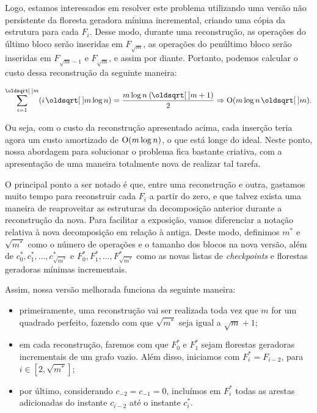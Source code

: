Logo, estamos interessados em resolver este problema utilizando uma versão não persistente da floresta geradora mínima incremental, criando uma cópia da estrutura para cada $F_i$. Desse modo, durante uma reconstrução, as operações do último bloco serão inseridas em $F_{\sqrt{m}}$, as operações do penúltimo bloco serão inseridas em $F_{\sqrt{m} - 1}$ e $F_{\sqrt{m}}$, e assim por diante. Portanto, podemos calcular o custo dessa reconstrução da seguinte maneira:

\begin{equation}
    \sum_{i=1}^{\sqrt{m}} (i \sqrt{m} \log n) =
    \frac{m \log n \: (\sqrt{m} + 1)}{2} \Rightarrow
    \Oh(m \log n \sqrt{m}).
\end{equation}

Ou seja, com o custo da reconstrução apresentado acima, cada inserção teria agora um custo amortizado de $\mathrm{O}(m \log n)$, o que está longe do ideal. Neste ponto, nossa abordagem para solucionar o problema fica bastante criativa, com a apresentação de uma maneira totalmente nova de realizar tal tarefa.

O principal ponto a ser notado é que, entre uma reconstrução e outra, gastamos muito tempo para reconstruir cada $F_i$ a partir do zero, e que talvez exista uma maneira de reaproveitar as estruturas da decomposição anterior durante a reconstrução da nova. Para facilitar a exposição, vamos diferenciar a notação relativa à nova decomposição em relação à antiga. Deste modo, definimos $m^*$ e $\sqrt{m^*}$ como o número de operações e o tamanho dos blocos na nova versão, além de $c_0^*, c_1^*, \dots, c_{\sqrt{m^*}}^*$ e $F_0^*, F_1^*, \dots, F_{\sqrt{m^*}}^*$ como as novas listas de \emph{checkpoints} e florestas geradoras mínimas incrementais.

Assim, nossa versão melhorada funciona da seguinte maneira:

\begin{itemize}
    \item primeiramente, uma reconstrução vai ser realizada toda vez que $m$ for um quadrado perfeito, fazendo com que $\sqrt{m^*} $ seja igual a $\sqrt{m} + 1$;
    \item em cada reconstrução, faremos com que $F_0^*$ e $F_1^*$ sejam florestas geradoras incrementais de um grafo vazio. Além disso, iniciamos com $F_i^* = F_{i-2}$, para $i \in [2, \sqrt{m^*}]$;
    \item por último, considerando $c_{-2} = c_{-1} = 0$, incluímos em $F_i^*$ todas as arestas adicionadas do instante $c_{i-2}$ até o instante $c_i^*$.
\end{itemize}

